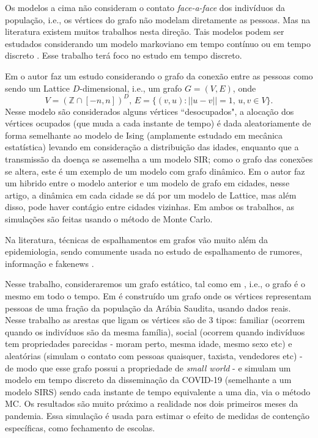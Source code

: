 \documentclass{article}
\newcommand{\Z}{\mathbb{Z}}
\begin{document}
Os modelos a cima não consideram o contato \textit{face-a-face} dos indivíduos da população, i.e., os vértices do grafo não modelam diretamente as pessoas. Mas na literatura existem muitos trabalhos nesta direção. Tais modelos podem ser estudados considerando um modelo markoviano em tempo contínuo \cite{grafoTC} ou em tempo discreto \cite{lattice, LatticeGeo,EMV, Main, Main2}. Esse trabalho terá foco no estudo em tempo discreto.

Em \cite{lattice} o autor faz um estudo considerando o grafo da conexão entre as pessoas como sendo um Lattice $D$-dimensional, i.e., um grafo $G=(V,E)$, onde
\[V = (\Z \cap [-n,n])^D, \, E = \{(v,u) : ||u-v|| = 1, \, u,v \in V\}. \]
 Nesse modelo são considerados alguns vértices ``desocupados", a alocação dos vértices ocupados (que muda a cada instante de tempo) é dada aleatoriamente de forma semelhante ao modelo de Ising (amplamente estudado em mecânica estatística) levando em consideração a distribuição das idades, enquanto que a transmissão da doença se assemelha a um modelo SIR; como o grafo das conexões se altera, este é um exemplo de um modelo com grafo dinâmico. Em \cite{LatticeGeo} o autor faz um hibrido entre o modelo anterior e um modelo de grafo em cidades, nesse artigo, a dinâmica em cada cidade se dá por um modelo de Lattice, mas além disso, pode haver contágio entre cidades vizinhas. Em ambos os trabalhos, as simulações são feitas usando o método de Monte Carlo.

Na literatura, técnicas de espalhamentos em grafos vão muito além da epidemiologia, sendo comumente usada no estudo de espalhamento de rumores, informação e fakenews \cite{rumor, rumor1}.

Nesse trabalho, consideraremos um grafo estático, tal como em \cite{Main2}, i.e., o grafo é o mesmo em todo o tempo. Em \cite{Main2} é construído um grafo onde os vértices representam pessoas de uma fração da população da Arábia Saudita, usando dados reais. Nesse trabalho as arestas que ligam os vértices são de 3 tipos: familiar (ocorrem quando os indivíduos são da mesma família), social (ocorrem quando indivíduos tem propriedades parecidas - moram perto, mesma idade, mesmo sexo etc) e aleatórias (simulam o contato com pessoas quaisquer, taxista, vendedores etc) - de modo que esse grafo possui a propriedade de \textit{small world} - e simulam um modelo em tempo discreto da disseminação da COVID-19 (semelhante a um modelo SIRS) sendo cada instante de tempo equivalente a uma dia, via o método MC. Os resultados são muito próximo a realidade nos dois primeiros meses da pandemia. Essa simulação é usada para estimar o efeito de medidas de contenção específicas, como fechamento de escolas.
\end{document}
